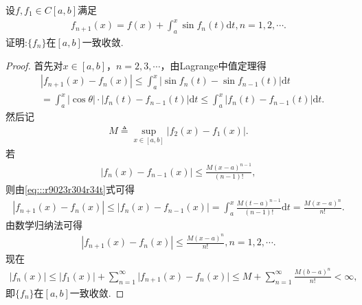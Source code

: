 \documentclass[../../main.tex]{subfiles}%
\begin{document}
\begin{example}
设$f,f_1 \in C[a,b]$满足
\begin{align*}
f_{n+1}(x) = f(x) + \int_a^x \sin f_n(t)\mathrm{d}t, n = 1,2,\cdots.
\end{align*}
证明:$\{f_n\}$在$[a,b]$一致收敛.
\end{example}
\begin{proof}

首先对$x \in [a,b]$，$n = 2,3,\cdots$，由Lagrange中值定理得
\begin{align}
&|f_{n+1}(x) - f_n(x)| \leqslant \int_a^x |\sin f_n(t) - \sin f_{n-1}(t)| \mathrm{d}t \nonumber \\
&= \int_a^x |\cos \theta| \cdot |f_n(t) - f_{n-1}(t)| \mathrm{d}t \leqslant \int_a^x |f_n(t) - f_{n-1}(t)| \mathrm{d}t.\label{eq:::r9023r304r34t}
\end{align}
然后记
\begin{align*}
M \triangleq \sup_{x \in [a,b]} |f_2(x) - f_1(x)|.
\end{align*}
若
\begin{align*}
|f_n(x) - f_{n-1}(x)| \leqslant \frac{M(x - a)^{n-1}}{(n - 1)!},
\end{align*}
则由\eqref{eq:::r9023r304r34t}式可得
\begin{align*}
|f_{n+1}(x)-f_n(x)|\leqslant |f_n(x)-f_{n-1}(x)|=\int_a^x{\frac{M(t-a)^{n-1}}{(n-1)!}\mathrm{d}t}=\frac{M(x-a)^n}{n!}.
\end{align*}
由数学归纳法可得
\begin{align*}
|f_{n+1}(x) - f_n(x)| \leqslant \frac{M(x - a)^n}{n!}, n = 1,2,\cdots.
\end{align*}
现在
\begin{align*}
\left| f_n\left( x \right) \right|\leqslant \left| f_1\left( x \right) \right|+\sum_{n=1}^{\infty}{|f_{n+1}(x)}-f_n(x)|\leqslant M+\sum_{n=1}^{\infty}{\frac{M(b-a)^n}{n!}}<\infty ,
\end{align*}
即$\{f_n\}$在$[a,b]$一致收敛.

\end{proof}
\end{document}
